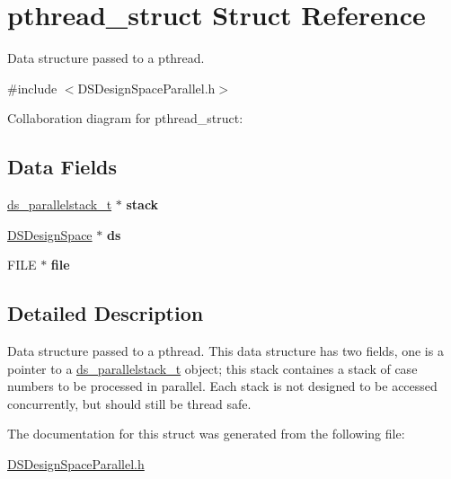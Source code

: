 \hypertarget{structpthread__struct}{
\section{pthread\_\-struct Struct Reference}
\label{structpthread__struct}
}


Data structure passed to a pthread.  




{\ttfamily \#include $<$DSDesignSpaceParallel.h$>$}



Collaboration diagram for pthread\_\-struct:\subsection*{Data Fields}
\begin{DoxyCompactItemize}
\item 
\hypertarget{structpthread__struct_a32b52047d490a4dc379730c4da799839}{
\hyperlink{structds__parallelstack__t}{ds\_\-parallelstack\_\-t} $\ast$ {\bfseries stack}}
\label{structpthread__struct_a32b52047d490a4dc379730c4da799839}

\item 
\hypertarget{structpthread__struct_a6b6930b2a1fc8c1132825686223af6ad}{
\hyperlink{struct_d_s_design_space}{DSDesignSpace} $\ast$ {\bfseries ds}}
\label{structpthread__struct_a6b6930b2a1fc8c1132825686223af6ad}

\item 
\hypertarget{structpthread__struct_a702945180aa732857b380a007a7e2a21}{
FILE $\ast$ {\bfseries file}}
\label{structpthread__struct_a702945180aa732857b380a007a7e2a21}

\end{DoxyCompactItemize}


\subsection{Detailed Description}
Data structure passed to a pthread. This data structure has two fields, one is a pointer to a \hyperlink{structds__parallelstack__t}{ds\_\-parallelstack\_\-t} object; this stack containes a stack of case numbers to be processed in parallel. Each stack is not designed to be accessed concurrently, but should still be thread safe. 

The documentation for this struct was generated from the following file:\begin{DoxyCompactItemize}
\item 
\hyperlink{_d_s_design_space_parallel_8h}{DSDesignSpaceParallel.h}\end{DoxyCompactItemize}
